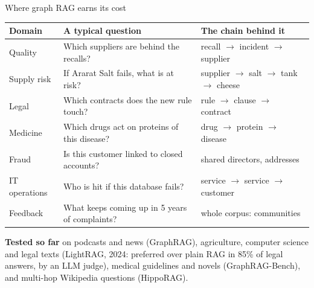 \documentclass[aspectratio=169]{beamer}
\begin{document}
\begin{frame}{Where graph RAG earns its cost}
  \vspace{-0.1em}
  \begin{center}
  \footnotesize
  \setlength{\tabcolsep}{4pt}
  \begin{tabular}{lll}
    \toprule
    \textbf{Domain} & \textbf{A typical question} & \textbf{The chain behind it} \\
    \midrule
    Quality & Which suppliers are behind the recalls? & recall $\to$ incident $\to$ supplier \\
    Supply risk & If Ararat Salt fails, what is at risk? & supplier $\to$ salt $\to$ tank $\to$ cheese \\
    Legal & Which contracts does the new rule touch? & rule $\to$ clause $\to$ contract \\
    Medicine & Which drugs act on proteins of this disease? & drug $\to$ protein $\to$ disease \\
    Fraud & Is this customer linked to closed accounts? & shared directors, addresses \\
    IT operations & Who is hit if this database fails? & service $\to$ service $\to$ customer \\
    Feedback & What keeps coming up in 5 years of complaints? & whole corpus: communities \\
    \bottomrule
  \end{tabular}
  \end{center}

  \vspace{0.1em}
  {\footnotesize \textbf{Tested so far} on podcasts and news (GraphRAG), agriculture, computer science
  and legal texts (LightRAG, 2024: preferred over plain RAG in 85\% of legal answers, by an LLM
  judge), medical guidelines and novels (GraphRAG-Bench), and multi-hop Wikipedia questions
  (HippoRAG).}
\end{frame}
\end{document}
